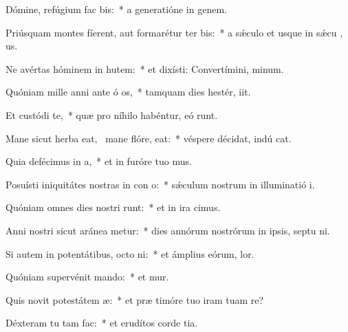 \item Dómine, refúgium fac  bis:~* a generatióne in genem.
\item Priúsquam montes fíerent, aut formarétur ter  bis:~* a sǽculo et usque in sǽcu  , us.
\item Ne avértas hóminem in hutem:~* et dixísti: Convertímini,  minum.
\item Quóniam mille anni ante ó os,~* tamquam dies hestér,  iit.
\item Et custódi  te,~* quæ pro níhilo habéntur, eó  runt.
\item Mane sicut herba eat,~\pscross{} mane flóre,  eat:~* véspere décidat, indú  cat.
\item Quia defécimus in  a,~* et in furóre tuo  mus.
\item Posuísti iniquitátes nostras in con o:~* sǽculum nostrum in illuminatió  i.
\item Quóniam omnes dies nostri runt:~* et in ira  cimus.
\item Anni nostri sicut aránea metur:~* dies annórum nostrórum in ipsis, septu ni.
\item Si autem in potentátibus, octo ni:~* et ámplius eórum,   lor.
\item Quóniam supervénit mando:~* et mur.
\item Quis novit potestátem  æ:~* et præ timóre tuo iram tuam re?
\item Déxteram tu  tam fac:~* et erudítos corde  tia.

